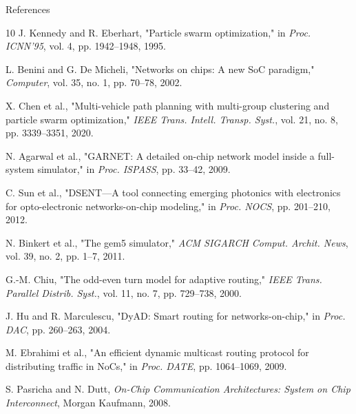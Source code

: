 \documentclass[10pt,aspectratio=169]{beamer}
\begin{document}
\begin{frame}{References}
    \tiny
    
    \begin{thebibliography}{10}
        J. Kennedy and R. Eberhart, "Particle swarm optimization," in \emph{Proc. ICNN'95}, vol. 4, pp. 1942–1948, 1995.
        
        L. Benini and G. De Micheli, "Networks on chips: A new SoC paradigm," \emph{Computer}, vol. 35, no. 1, pp. 70–78, 2002.
        
        X. Chen et al., "Multi-vehicle path planning with multi-group clustering and particle swarm optimization," \emph{IEEE Trans. Intell. Transp. Syst.}, vol. 21, no. 8, pp. 3339–3351, 2020.
        
        N. Agarwal et al., "GARNET: A detailed on-chip network model inside a full-system simulator," in \emph{Proc. ISPASS}, pp. 33–42, 2009.
        
        C. Sun et al., "DSENT—A tool connecting emerging photonics with electronics for opto-electronic networks-on-chip modeling," in \emph{Proc. NOCS}, pp. 201–210, 2012.
        
        N. Binkert et al., "The gem5 simulator," \emph{ACM SIGARCH Comput. Archit. News}, vol. 39, no. 2, pp. 1–7, 2011.
        
        G.-M. Chiu, "The odd-even turn model for adaptive routing," \emph{IEEE Trans. Parallel Distrib. Syst.}, vol. 11, no. 7, pp. 729–738, 2000.
        
        J. Hu and R. Marculescu, "DyAD: Smart routing for networks-on-chip," in \emph{Proc. DAC}, pp. 260–263, 2004.
        
        M. Ebrahimi et al., "An efficient dynamic multicast routing protocol for distributing traffic in NoCs," in \emph{Proc. DATE}, pp. 1064–1069, 2009.
        
        S. Pasricha and N. Dutt, \emph{On-Chip Communication Architectures: System on Chip Interconnect}, Morgan Kaufmann, 2008.
    \end{thebibliography}
\end{frame}
\end{document}
